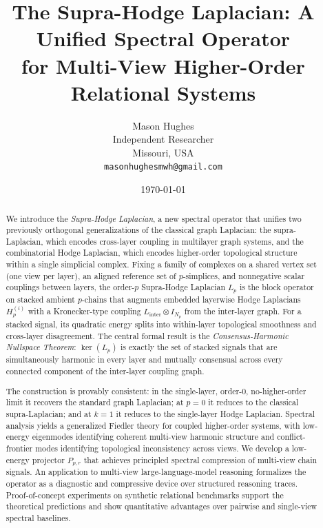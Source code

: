 \documentclass[11pt]{article}
\title{The Supra-Hodge Laplacian: A Unified Spectral Operator\\
       for Multi-View Higher-Order Relational Systems}
\author{Mason Hughes\\[4pt]
        Independent Researcher\\
        Missouri, USA\\
        \texttt{masonhughesmwh@gmail.com}}
\date{\today}
\theoremstyle{definition}
\theoremstyle{remark}
\begin{document}
\maketitle

\begin{abstract}
We introduce the \emph{Supra-Hodge Laplacian}, a new spectral operator that
unifies two previously orthogonal generalizations of the classical graph
Laplacian: the supra-Laplacian, which encodes cross-layer coupling in
multilayer graph systems, and the combinatorial Hodge Laplacian, which encodes
higher-order topological structure within a single simplicial complex. Fixing a
family of complexes on a shared vertex set (one view per layer), an aligned
reference set of $p$-simplices, and nonnegative scalar couplings between layers,
the order-$p$ Supra-Hodge Laplacian $L_p$ is the block operator on stacked
ambient $p$-chains that augments embedded layerwise Hodge Laplacians
$H_p^{(i)}$ with a Kronecker-type coupling $L_{\mathrm{inter}}\otimes I_{N_p}$
from the inter-layer graph. For a stacked signal, its quadratic energy splits
into within-layer topological smoothness and cross-layer disagreement. The
central formal result is the
\emph{Consensus-Harmonic Nullspace Theorem}: $\ker(L_p)$ is exactly the set of
stacked signals that are simultaneously harmonic in every layer and mutually
consensual across every connected component of the inter-layer coupling graph.

The construction is provably consistent: in the single-layer, order-$0$,
no-higher-order limit it recovers the standard graph Laplacian; at $p=0$ it
reduces to the classical supra-Laplacian; and at $k=1$ it reduces to the
single-layer Hodge Laplacian. Spectral analysis yields a
generalized Fiedler theory for coupled higher-order systems, with low-energy
eigenmodes identifying coherent multi-view harmonic structure and
conflict-frontier modes identifying topological inconsistency across views. We
develop a low-energy projector $P_{p,r}$ that achieves principled spectral
compression of multi-view chain signals. An application to multi-view
large-language-model reasoning formalizes the operator as a diagnostic and
compressive device over structured reasoning traces.
Proof-of-concept experiments on synthetic relational benchmarks support the theoretical predictions and show quantitative advantages over pairwise and single-view spectral baselines.
\end{abstract}
\end{document}
